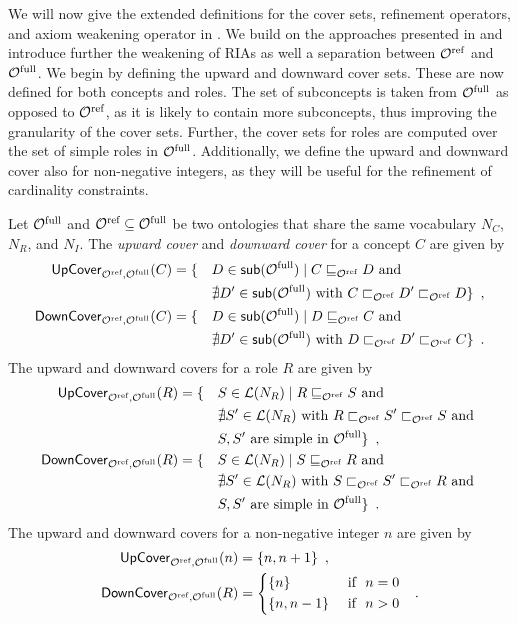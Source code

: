 
We will now give the extended definitions for the cover sets, refinement operators, and axiom weakening operator in \SROIQ. We build on the approaches presented in \cite{confalonieri2020towards} and introduce further the weakening of RIAs as well a separation between ${\mathcal{O}^\textnormal{ref}}$ and ${\mathcal{O}^\textnormal{full}}$. We begin by defining the upward and downward cover sets. These are now defined for both concepts and roles. The set of subconcepts is taken from ${\mathcal{O}^\textnormal{full}}$ as opposed to ${\mathcal{O}^\textnormal{ref}}$, as it is likely to contain more subconcepts, thus improving the granularity of the cover sets. Further, the cover sets for roles are computed over the set of simple roles in ${\mathcal{O}^\textnormal{full}}$. Additionally, we define the upward and downward cover also for non-negative integers, as they will be useful for the refinement of cardinality constraints.

\begin{definition} \label{def:covers}
Let ${\mathcal{O}^\textnormal{full}}$ and ${\mathcal{O}^\textnormal{ref}} \subseteq {\mathcal{O}^\textnormal{full}}$ be two \SROIQ ontologies that share the same vocabulary $N_C$, $N_R$, and $N_I$. The \emph{upward cover} and \emph{downward cover} for a concept $C$ are given by
\begin{alignat*}{2}
    {\ensuremath{\mathsf{UpCover}}}_{{\mathcal{O}^\textnormal{ref}},{\mathcal{O}^\textnormal{full}}}(C) &= \{ &&D \in {\ensuremath{\mathsf{sub}}}({\mathcal{O}^\textnormal{full}}) \mid C \sqsubseteq_{\mathcal{O}^\textnormal{ref}} D \text{ and } \\
    &&&\nexists D' \in {\ensuremath{\mathsf{sub}}}({\mathcal{O}^\textnormal{full}}) \text{ with } C \sqsubset_{\mathcal{O}^\textnormal{ref}} D' \sqsubset_{\mathcal{O}^\textnormal{ref}} D \} \enspace, \\
    {\mathsf{DownCover}}_{{\mathcal{O}^\textnormal{ref}},{\mathcal{O}^\textnormal{full}}}(C) &= \{ &&D \in {\ensuremath{\mathsf{sub}}}({\mathcal{O}^\textnormal{full}}) \mid D \sqsubseteq_{\mathcal{O}^\textnormal{ref}} C \text{ and } \\
    &&&\nexists D' \in {\ensuremath{\mathsf{sub}}}({\mathcal{O}^\textnormal{full}}) \text{ with } D \sqsubset_{\mathcal{O}^\textnormal{ref}} D' \sqsubset_{\mathcal{O}^\textnormal{ref}} C \} \enspace.
\end{alignat*}
The upward and downward covers for a role $R$ are given by
\begin{alignat*}{2}
    {\ensuremath{\mathsf{UpCover}}}_{{\mathcal{O}^\textnormal{ref}},{\mathcal{O}^\textnormal{full}}}(R) &= \{ &&S \in \mathcal{L}(N_R) \mid R \sqsubseteq_{\mathcal{O}^\textnormal{ref}} S \text{ and } \\
    &&& \nexists S' \in \mathcal{L}(N_R) \text{ with } R \sqsubset_{\mathcal{O}^\textnormal{ref}} S' \sqsubset_{\mathcal{O}^\textnormal{ref}} S \text{ and } \\
    &&& S, S' \text{ are simple in } {\mathcal{O}^\textnormal{full}} \} \enspace, \\
    {\mathsf{DownCover}}_{{\mathcal{O}^\textnormal{ref}},{\mathcal{O}^\textnormal{full}}}(R) &= \{ &&S \in \mathcal{L}(N_R) \mid S \sqsubseteq_{\mathcal{O}^\textnormal{ref}} R \text{ and } \\
    &&&\nexists S' \in \mathcal{L}(N_R) \text{ with } S \sqsubset_{\mathcal{O}^\textnormal{ref}} S' \sqsubset_{\mathcal{O}^\textnormal{ref}} R \text{ and } \\
    &&& S, S' \text{ are simple in } {\mathcal{O}^\textnormal{full}} \} \enspace.
\end{alignat*}
The upward and downward covers for a non-negative integer $n$ are given by
\begin{alignat*}{2}
    \UpC_{\Omcref,\Omcfull}(n) &= \{ n, n + 1 \} \enspace, \\
    \DownC_{\Omcref,\Omcfull}(R) &=
    \begin{cases*}
      \{ n \} & \text{ if } $n = 0$ \\
      \{ n, n - 1 \} & \text{ if } $n > 0$
    \end{cases*} \enspace.
\end{alignat*}
\end{definition}

